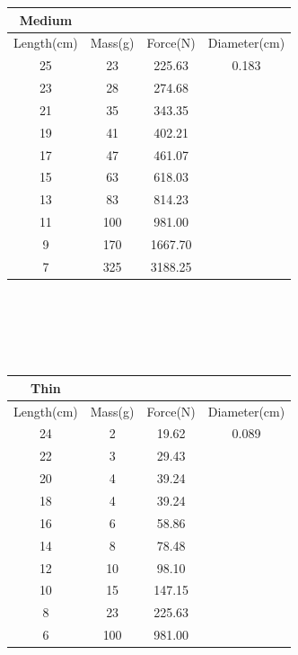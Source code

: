 \documentclass{article}
\begin{document}
\centering
\begin{tabular}{|| c | c | c | c ||}
 \hline
 Medium &\ &\ &\ \\
 \hline
 Length(cm) & Mass(g) & Force(N) & Diameter(cm) \\
 \hline
 \hline
 25 & 23 & 225.63 & 0.183\\
 23 & 28 & 274.68 &\ \\
 21 & 35 & 343.35 &\ \\
 19 & 41 & 402.21 &\ \\
 17 & 47 & 461.07 &\ \\
 15 & 63 & 618.03 &\ \\
 13 & 83 & 814.23 &\ \\
 11 & 100 & 981.00 &\ \\
 9 & 170 & 1667.70 &\ \\
 7 & 325 & 3188.25 &\ \\
 \hline
\end{tabular}\\\ \\\ \\\ 

\centering
\begin{tabular}{|| c | c | c | c ||}
 \hline
 Thin &\ &\ &\ \\
 \hline
 Length(cm) & Mass(g) & Force(N) & Diameter(cm) \\
 \hline
 \hline
 24 & 2 & 19.62 & 0.089\\
 22 & 3 & 29.43 &\ \\
 20 & 4 & 39.24 &\ \\
 18 & 4 & 39.24 &\ \\
 16 & 6 & 58.86 &\ \\
 14 & 8 & 78.48 &\ \\
 12 & 10 & 98.10 &\ \\
 10 & 15 & 147.15 &\ \\
 8 & 23 & 225.63 &\ \\
 6 & 100 & 981.00 &\ \\
 \hline
\end{tabular}
\end{document}
